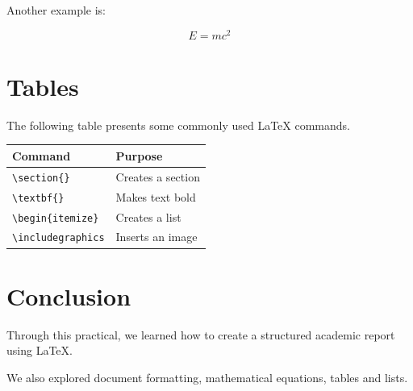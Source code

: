 \documentclass[12pt,a4paper]{article}
\begin{document}
Another example is:

\begin{equation}
E = mc^2
\end{equation}

\section{Tables}

The following table presents some commonly used
LaTeX commands.

\begin{center}
\begin{tabular}{ll}
\toprule
\textbf{Command} & \textbf{Purpose} \\
\midrule
\texttt{\textbackslash section\{\}} & Creates a section \\
\texttt{\textbackslash textbf\{\}} & Makes text bold \\
\texttt{\textbackslash begin\{itemize\}} & Creates a list \\
\texttt{\textbackslash includegraphics} & Inserts an image \\
\bottomrule
\end{tabular}
\end{center}

\section{Conclusion}

Through this practical, we learned how to create
a structured academic report using LaTeX.

We also explored document formatting, mathematical
equations, tables and lists.
\end{document}
